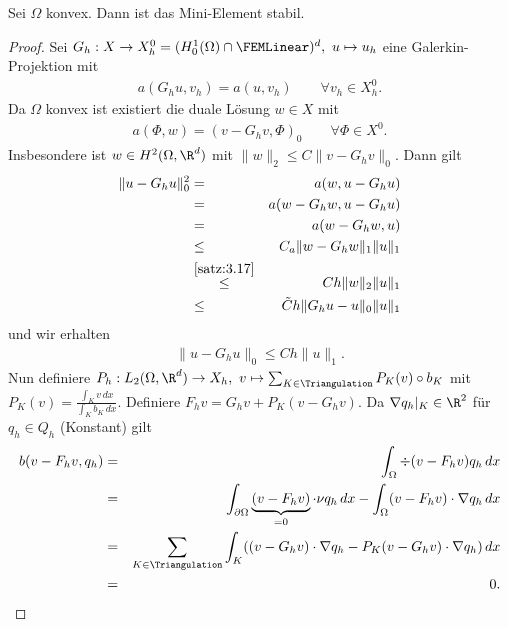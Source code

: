 \begin{Satz}
    \label{satz:5.14}
    Sei $\Omega$ konvex. Dann ist das Mini-Element stabil.
\end{Satz}


\begin{proof}
    Sei $G_h: X \to X_h^0 = (H_0^1(\Omega) \cap \FEMLinear)^d, \ u \mapsto
    u_h$ eine Galerkin-Projektion mit
    \begin{eqnarray*}
        a(G_h u, v_h) = a(u, v_h) \qquad \forall v_h\in X_h^0.
    \end{eqnarray*}
    Da $\Omega$ konvex ist existiert die duale Lösung $w\in X$ mit
    \begin{eqnarray*}
        a(\Phi, w) = (v - G_h v, \Phi)_0
        \qquad \forall \Phi\in X^0.
    \end{eqnarray*}
    Insbesondere ist $w\in H^2(\Omega, \R^d)$ mit $\|w\|_2 \le C
    \|v - G_h v\|_0$.
    Dann gilt
    \begin{eqnarray*}
            \|u - G_h u\|_0^2
        &=& a(w, u - G_h u) \\
        &=& a(w - G_h w, u - G_h u) \\
        &=& a(w - G_h w, u) \\
        &\le& C_a \|w - G_h w\|_1 \|u\|_1 \\
        &\stackrel{\eqref{satz:3.17}}{\le}&
              C h \|w\|_2 \|u\|_1 \\
        &\le& \tilde C h \|G_h u - u\|_0 \|u\|_1
    \end{eqnarray*}
    und wir erhalten
    \begin{eqnarray*}
        \|u - G_h u\|_0 \le C h \|u\|_1.
    \end{eqnarray*}
    Nun definiere $P_h: L_2(\Omega, \R^d) \to X_h, \
    v \mapsto \sum_{K\in \Triangulation} P_K(v) \circ b_K$ mit
    $P_K(v) = \frac{\int_K v \,dx}{\int_K b_K \,dx}$.
    Definiere $F_h v = G_h v + P_K(v - G_h v)$.
    Da $\nabla q_h|_K\in \R^2$ für $q_h\in Q_h$ (Konstant) gilt
    \begin{eqnarray*}
            b(v - F_h v, q_h)
        &=& \int_\Omega \div(v - F_h v) q_h \,dx \\
        &=& \int_{\partial\Omega} \underbrace{(v - F_h v)}_{= 0} \cdot \nu q_h
            \,dx - \int_\Omega (v - F_h v) \cdot \nabla q_h \,dx \\
        &=& \sum_{K\in \Triangulation} \int_K ((v - G_h v) \cdot \nabla q_h -
            P_K(v - G_h v) \cdot \nabla q_h) \,dx \\
        &=& 0.
    \end{eqnarray*}

\end{proof}
